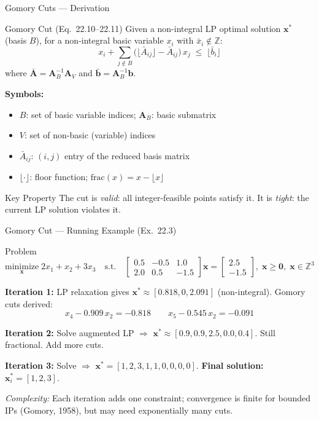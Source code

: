 \documentclass[aspectratio=169,10pt]{beamer}
\newcommand{\bx}{\mathbf{x}}
\newcommand{\bb}{\mathbf{b}}
\newcommand{\bA}{\mathbf{A}}
\newcommand{\ZZ}{\mathbb{Z}}
\begin{document}
\begin{frame}{Gomory Cuts --- Derivation}
  \begin{block}{Gomory Cut (Eq.\ 22.10--22.11)}
    Given a non-integral LP optimal solution $\bx^*$ (basis $B$), for a
    non-integral basic variable $x_i$ with $\bar{x}_i \notin \ZZ$:
    \begin{equation}
      x_i + \sum_{j \notin B} \bigl(\lfloor\bar{A}_{ij}\rfloor
        - \bar{A}_{ij}\bigr)\,x_j
      \;\leq\; \lfloor\bar{b}_i\rfloor
      \tag{22.11}
    \end{equation}
    where $\bar{\bA} = \bA_B^{-1}\bA_V$ and $\bar{\bb} = \bA_B^{-1}\bb$.
  \end{block}

  \textbf{Symbols:}
  \begin{itemize}
    \item $B$: set of basic variable indices; $\bA_B$: basic submatrix
    \item $V$: set of non-basic (variable) indices
    \item $\bar{A}_{ij}$: $(i,j)$ entry of the reduced basis matrix
    \item $\lfloor \cdot \rfloor$: floor function; $\text{frac}(x) = x - \lfloor x \rfloor$
  \end{itemize}

  \begin{block}{Key Property}
    The cut is \emph{valid}: all integer-feasible points satisfy it.
    It is \emph{tight}: the current LP solution violates it.
  \end{block}
\end{frame}

\begin{frame}{Gomory Cut --- Running Example (Ex.\ 22.3)}
  \begin{block}{Problem}
    \[
      \underset{\bx}{\text{minimize}}\; 2x_1 + x_2 + 3x_3
      \quad\text{s.t.}\quad
      \begin{bmatrix}0.5 & -0.5 & 1.0 \\ 2.0 & 0.5 & -1.5\end{bmatrix}\bx
      = \begin{bmatrix}2.5\\-1.5\end{bmatrix},
      \;\bx \geq \mathbf{0},\;\bx \in \ZZ^3
    \]
  \end{block}

  \textbf{Iteration 1:} LP relaxation gives $\bx^* \approx [0.818, 0, 2.091]$
  (non-integral). Gomory cuts derived:
  \[
    x_4 - 0.909\,x_2 = -0.818
    \qquad
    x_5 - 0.545\,x_2 = -0.091
  \]

  \textbf{Iteration 2:} Solve augmented LP $\Rightarrow$
  $\bx^* \approx [0.9, 0.9, 2.5, 0.0, 0.4]$. Still fractional.
  Add more cuts.

  \textbf{Iteration 3:} Solve $\Rightarrow$
  $\bx^* = [1, 2, 3, 1, 1, 0, 0, 0, 0]$.
  \textbf{Final solution:} $\bx_i^* = [1, 2, 3]$.

  \vspace{4pt}
  \textit{Complexity:} Each iteration adds one constraint; convergence is
  finite for bounded IPs (Gomory, 1958), but may need exponentially many cuts.
\end{frame}
\end{document}
